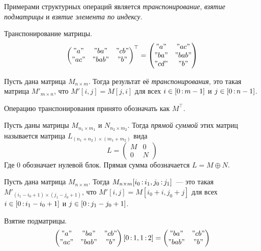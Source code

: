 Примерами структурных операций является \emph{транспонирование}, \emph{взятие подматрицы} и \emph{взятие элемента по индексу}.

    \begin{example}
        Транспонирование матрицы.
        \[
            \begin{pmatrix}
                "a"  & "ba"  & "cb" \\
                "ac" & "bab" & "b"
            \end{pmatrix}^\top =
            \begin{pmatrix}
                "a"  & "ac"  \\
                "ba" & "bab" \\
                "cd" & "b"
            \end{pmatrix}
        \]
    \end{example}

\begin{definition}
    Пусть дана матрица $M_{n \times m}$.
    Тогда результат её \emph{транспонирования}, это такая матрица $M'_{m \times n}$, что $M'[i,j] = M[j,i]$ для всех $i \in [0 \rng m - 1]$ и $j \in [0 \rng n - 1]$.

    Операцию транспонирования принято обозначать как $M^\top$.
\end{definition}

\begin{definition}
    Пусть даны матрицы $M_{n_1 \times m_1}$ и $N_{n_2 \times m_2}$.
    Тогда \emph{прямой суммой} этих матриц называется матрица $L_{(n_1 + n_2) \times (m_1 + m_2)}$ вида
    \[
        L =
        \begin{pmatrix}
            M & 0 \\
            0 & N
        \end{pmatrix}
    \]
    Где 0 обозначает нулевой блок. Прямая сумма обозначается $L = M \oplus N$.
\end{definition}

\begin{definition}
    Пусть дана матрица $M_{n\times m}$.
    Тогда $M_{n \times m}[i_0 \rng i_1, j_0 \rng j_1]$~--- это такая $M'_{(i_1 - i_0 + 1) \times (j_1 - j_0 + 1)}$, что $M'[i, j] = M[i_0 + i, j_0 + j]$ для всех $i \in [0 \rng i_1 - i_0 + 1]$ и $j \in [0 \rng j_1 - j_0 + 1]$.
\end{definition}

\begin{example}
    Взятие подматрицы.
    \begin{multline*}
        \begin{pmatrix}
            "a"  & "ba"  & "cb" \\
            "ac" & "bab" & "b"
        \end{pmatrix} [0 \rng 1, 1 \rng 2] = 
        \begin{pmatrix}
            "ba"  & "cb" \\
            "bab" & "b"
        \end{pmatrix}
    \end{multline*}
\end{example}

